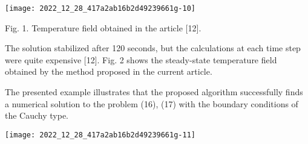 \begin{center}
\texttt{[image: 2022\_12\_28\_417a2ab16b2d49239661g-10]}
\end{center}

Fig. 1. Temperature field obtained in the article [12].

The solution stabilized after 120 seconds, but the calculations at each time step were quite expensive [12]. Fig. 2 shows the steady-state temperature field obtained by the method proposed in the current article.

The presented example illustrates that the proposed algorithm successfully finds a numerical solution to the problem (16), (17) with the boundary conditions of the Cauchy type.

\begin{center}
\texttt{[image: 2022\_12\_28\_417a2ab16b2d49239661g-11]}
\end{center}
